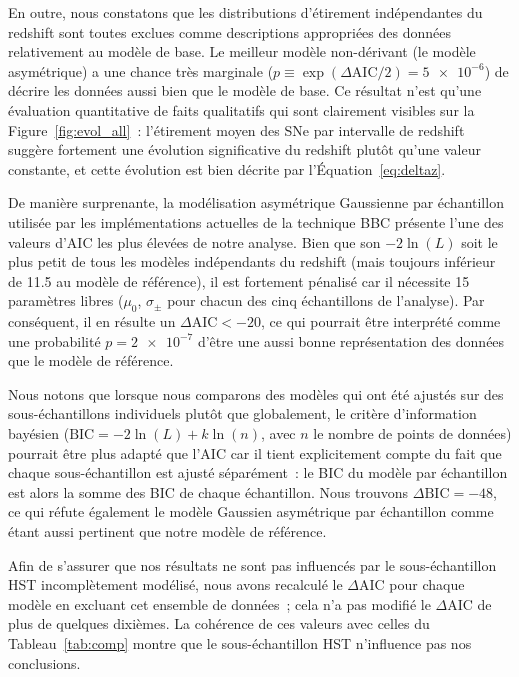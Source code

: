 \documentclass[../main/main.tex]{subfiles}
\begin{document}
En outre, nous constatons que les distributions d'étirement indépendantes du
redshift sont toutes exclues comme descriptions appropriées des données
relativement au modèle de base. Le meilleur modèle  non-dérivant (le modèle
asymétrique) a une chance très marginale ($p \equiv \exp(\Delta\mathrm{AIC}/2) =
\num{5e-6}$) de décrire les données aussi bien que le modèle de base. Ce
résultat n'est qu'une évaluation quantitative de faits qualitatifs qui sont
clairement visibles sur la Figure~\ref{fig:evol_all}~: l'étirement moyen des SNe
par intervalle de redshift suggère fortement une évolution significative du
redshift plutôt qu'une valeur constante, et cette évolution est bien décrite par
l'Équation~\ref{eq:deltaz}.

De manière surprenante, la modélisation asymétrique Gaussienne par échantillon
utilisée par les implémentations actuelles de la technique BBC
\citep{scolnic2016, kessler2017} présente l'une des valeurs d'AIC les plus
élevées de notre analyse. Bien que son $-2\ln(L)$ soit le plus petit de tous les
modèles indépendants du redshift (mais toujours inférieur de \num{11.5} au
modèle de référence), il est fortement pénalisé car il nécessite 15 paramètres
libres ($\mu_0$, $\sigma_{\pm}$ pour chacun des cinq échantillons de l'analyse).
Par conséquent, il en résulte un $\Delta\mathrm{AIC} < -20$, ce qui pourrait
être interprété comme une probabilité $p = \num{2e-7}$ d'être une aussi bonne
représentation des données que le modèle de référence.

Nous notons que lorsque nous comparons des modèles qui ont été ajustés sur des
sous-échantillons individuels plutôt que globalement, le critère d'information
bayésien ($\mathrm{BIC} = -2\ln(L) + k\ln(n)$, avec $n$ le nombre de points de
données) pourrait être plus adapté que l'AIC car il tient explicitement compte
du fait que chaque sous-échantillon est ajusté séparément~: le BIC du modèle par
échantillon est alors la somme des BIC de chaque échantillon. Nous trouvons
$\Delta\mathrm{BIC} = -48$, ce qui réfute également le modèle Gaussien
asymétrique par échantillon comme étant aussi pertinent que notre modèle de
référence.

Afin de s'assurer que nos résultats ne sont pas influencés par le
sous-échantillon HST incomplètement modélisé, nous avons recalculé le
$\Delta$AIC pour chaque modèle en excluant cet ensemble de données~; cela n'a
pas modifié le $\Delta$AIC de plus de quelques dixièmes. La cohérence de ces
valeurs avec celles du Tableau~\ref{tab:comp} montre que le sous-échantillon HST
n'influence pas nos conclusions.
\end{document}
